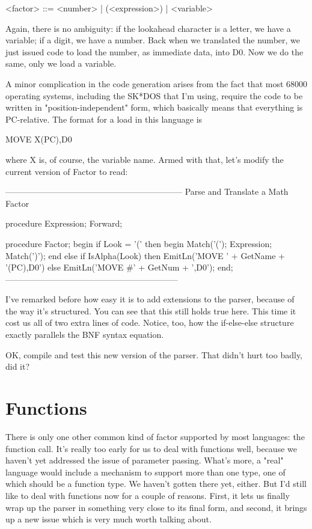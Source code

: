 \documentclass[float=false, crop=false]{standalone}
\begin{document}
     <factor> ::= <number> | (<expression>) | <variable>


Again, there is no ambiguity: if the lookahead character is a letter, we have a
variable; if a digit, we have a number. Back when we translated the number, we
just issued code to load the number, as immediate data, into D0. Now we do the
same, only we load a variable.

A minor complication in the code generation arises from the fact that most 68000
operating systems, including the SK*DOS that I'm using, require the code to be
written in "position-independent" form, which basically means that everything is
PC-relative. The format for a load in this language is

               MOVE X(PC),D0

where X is, of course, the variable name.  Armed with that, let's
modify the current version of Factor to read:

\begin{code}
{---------------------------------------------------------------}
{ Parse and Translate a Math Factor }

procedure Expression; Forward;

procedure Factor;
begin
   if Look = '(' then begin
      Match('(');
      Expression;
      Match(')');
      end
   else if IsAlpha(Look) then
      EmitLn('MOVE ' + GetName + '(PC),D0')
   else
      EmitLn('MOVE #' + GetNum + ',D0');
end;
{--------------------------------------------------------------}
\end{code}

I've remarked before how easy it is to add extensions to the parser, because of
the way it's structured. You can see that this still holds true here. This time
it cost us all of two extra lines of code. Notice, too, how the if-else-else
structure exactly parallels the BNF syntax equation.

OK, compile and test this new version of the parser. That didn't hurt too badly,
did it?


\section{Functions}

There is only one other common kind of factor supported by most languages: the
function call. It's really too early for us to deal with functions well, because
we haven't yet addressed the issue of parameter passing. What's more, a "real"
language would include a mechanism to support more than one type, one of which
should be a function type. We haven't gotten there yet, either. But I'd still
like to deal with functions now for a couple of reasons. First, it lets us
finally wrap up the parser in something very close to its final form, and
second, it brings up a new issue which is very much worth talking about.
\end{document}
